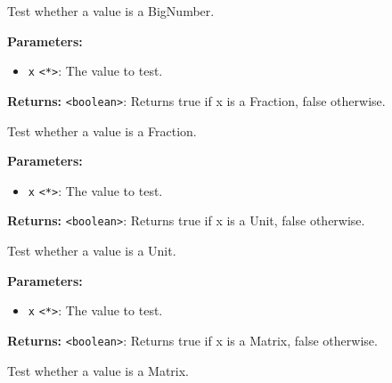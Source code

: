 \documentclass[12pt,a4paper]{article}
\begin{document}
\noindent Test whether a value is a BigNumber.

\vspace{5mm}
\noindent {}


\noindent \textbf{Parameters:}
\begin{itemize}
  \item \texttt{x} \texttt{<*>}: The value to test.
\end{itemize}

\noindent \textbf{Returns:} \texttt{<boolean>}: Returns true if \textasciigrave{}x\textasciigrave{} is a Fraction, false otherwise.

\noindent Test whether a value is a Fraction.

\vspace{5mm}
\noindent {}


\noindent \textbf{Parameters:}
\begin{itemize}
  \item \texttt{x} \texttt{<*>}: The value to test.
\end{itemize}

\noindent \textbf{Returns:} \texttt{<boolean>}: Returns true if \textasciigrave{}x\textasciigrave{} is a Unit, false otherwise.

\noindent Test whether a value is a Unit.

\vspace{5mm}
\noindent {}


\noindent \textbf{Parameters:}
\begin{itemize}
  \item \texttt{x} \texttt{<*>}: The value to test.
\end{itemize}

\noindent \textbf{Returns:} \texttt{<boolean>}: Returns true if \textasciigrave{}x\textasciigrave{} is a Matrix, false otherwise.

\noindent Test whether a value is a Matrix.

\vspace{5mm}
\noindent {}
\end{document}
